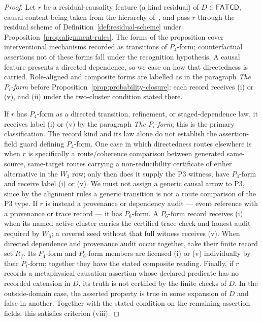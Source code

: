\documentclass[11pt]{article}
\theoremstyle{definition}
\newcommand{\FATCD}{\ensuremath{\mathsf{FATCD}}}
\newcommand{\Pthree}{\ensuremath{\mathrm{P3}}}
\begin{document}
\begin{proof}
Let \(r\) be a residual-causality feature (a kind residual) of
\(D \in \FATCD{}\), causal content being taken from the hierarchy of~\citet{Pearl2009}, and pass
\(r\) through the residual scheme of Definition~\ref{def:residual-scheme} under
Proposition~\ref{prop:alignment-rules}. The forms of the proposition cover
interventional mechanisms recorded as transitions of \(P_4\)-form; counterfactual assertions
not of these forms fall under the recognition hypothesis. A causal feature presents a
directed dependence, so we case on how that directedness is carried.
Role-aligned and composite forms are labelled as in the paragraph
\emph{The \(P_i\)-form} before Proposition~\ref{prop:probability-closure}: each
record receives (i) or (v), and (ii) under the two-cluster condition stated
there.

If \(r\) has \(P_4\)-form as a directed transition, refinement, or
staged-dependence law, it receives label (i) or (v) by the paragraph
\emph{The \(P_i\)-form}; this is the primary classification. The record
kind and its law alone do not establish the assertion-field guard
defining \(P_4\)-form. One case in which directedness routes elsewhere is when \(r\) is
specifically a route/coherence comparison between generated
same-source, same-target routes carrying a non-reducibility certificate of
either alternative in the \(W_3\) row; only then does it supply the \Pthree{}
witness, have \(P_3\)-form and receive label (i) or (v). We must not assign a
generic causal arrow to \Pthree{}, since by the alignment rules a
generic transition is not a route comparison of the \Pthree{} type. If
\(r\) is instead a provenance or dependency audit --- event reference
with a provenance or trace record --- it has \(P_6\)-form. A \(P_6\)-form
record receives (i) when its named active cluster carries the certified trace
check and honest audit required by \(W_6\); a covered seed without that full
witness receives (v). When directed dependence and provenance audit occur together, take
their finite record set \(R_f\). Its \(P_4\)-form and \(P_6\)-form
members are licensed (i) or (v) individually by their \(P_i\)-form; together they have
the stated composite reading.
Finally, if \(r\) records a metaphysical-causation assertion whose declared
predicate has no recorded extension in \(D\), its truth is not certified by
the finite checks of \(D\). In the outside-domain case, the asserted property is true in some
expansion of \(D\) and false in another. Together with the stated
condition on the remaining assertion fields, this satisfies
criterion (viii).


\end{proof}
\end{document}
